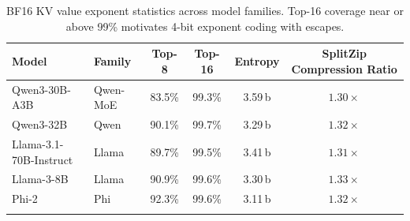 \begin{table}[t]
\centering
\small
\caption{BF16 KV value exponent statistics across model families. Top-16 coverage near or above 99\% motivates 4-bit exponent coding with escapes.}
\vspace{0.2em}
\label{tab:exponent}
\begin{tabular}{llcccc}
\toprule
Model & Family & Top-8 & Top-16 & Entropy & SplitZip Compression Ratio\\
\midrule
Qwen3-30B-A3B & Qwen-MoE & 83.5\% & 99.3\% & 3.59\,b & $1.30\times$\\
Qwen3-32B & Qwen & 90.1\% & 99.7\% & 3.29\,b & $1.32\times$\\
Llama-3.1-70B-Instruct & Llama & 89.7\% & 99.5\% & 3.41\,b& $1.31\times$\\
Llama-3-8B & Llama & 90.9\% & 99.6\% & 3.30\,b  & $1.33\times$\\
Phi-2 & Phi & 92.3\% & 99.6\% & 3.11\,b &  $1.32\times$\\
\bottomrule
\vspace{-2.5em}
\end{tabular}
\end{table}

